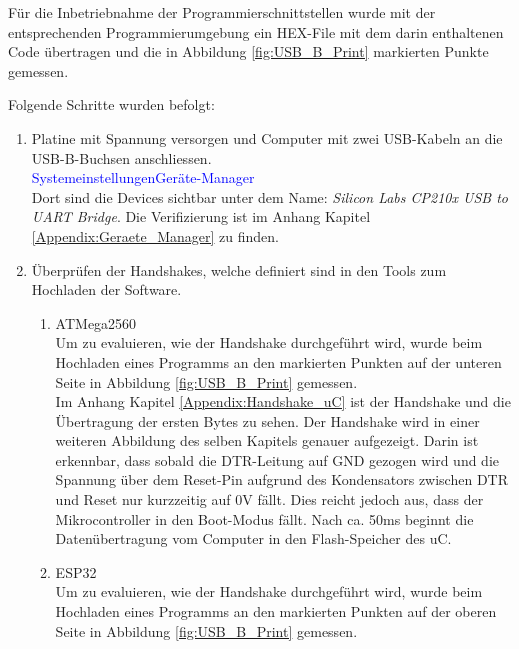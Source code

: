 
Für die Inbetriebnahme der Programmierschnittstellen wurde mit der entsprechenden Programmierumgebung ein HEX-File mit dem darin enthaltenen Code übertragen und die in Abbildung \ref{fig:USB_B_Print} markierten Punkte gemessen.

Folgende Schritte wurden befolgt:

\begin{enumerate}
\item Platine mit Spannung versorgen und Computer mit zwei USB-Kabeln an die USB-B-Buchsen anschliessen.\\
\textcolor{blue}{Systemeinstellungen\textrightarrow Geräte-Manager}\\
Dort sind die Devices sichtbar unter dem Name: \textit{Silicon Labs CP210x USB to UART Bridge}. Die Verifizierung ist im Anhang Kapitel \ref{Appendix:Geraete_Manager} zu finden.\newline
\item Überprüfen der Handshakes, welche definiert sind in den Tools zum Hochladen der Software.\\

\begin{enumerate}
\item ATMega2560\\

Um zu evaluieren, wie der Handshake durchgeführt wird, wurde beim Hochladen eines Programms an den markierten Punkten auf der unteren Seite in Abbildung \ref{fig:USB_B_Print} gemessen.\\

Im Anhang Kapitel \ref{Appendix:Handshake_uC} ist der Handshake und die Übertragung der ersten Bytes zu sehen. Der Handshake wird in einer weiteren Abbildung des selben Kapitels genauer aufgezeigt. Darin ist erkennbar, dass sobald die DTR-Leitung auf GND gezogen wird und die Spannung über dem Reset-Pin aufgrund des Kondensators zwischen DTR und Reset nur kurzzeitig auf 0V fällt. Dies reicht jedoch aus, dass der Mikrocontroller in den Boot-Modus fällt. Nach ca. 50ms beginnt die Datenübertragung vom Computer in den Flash-Speicher des uC.\\

\item ESP32\\

Um zu evaluieren, wie der Handshake durchgeführt wird, wurde beim Hochladen eines Programms an den markierten Punkten auf der oberen Seite in Abbildung \ref{fig:USB_B_Print} gemessen.\\


\end{enumerate}
\end{enumerate}
